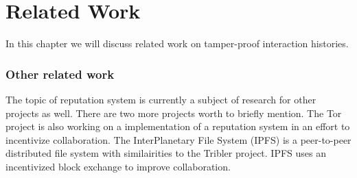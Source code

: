 \chapter{Related Work}
In this chapter we will discuss related work on tamper-proof interaction histories.





\subsection{Other related work}
The topic of reputation system is currently a subject of research for other projects as well.
There are two more projects worth to briefly mention.
The Tor project is also working on a implementation of a reputation system
in an effort to incentivize collaboration\cite{androulaki-torincentive}\cite{chen-torincentive}\cite{dingledine-torincentive}\cite{ghosh-torincentive}\cite{jansen-torincentive}.
The InterPlanetary File System (IPFS) is a peer-to-peer distributed file system with similairities to the Tribler project.
IPFS uses an incentivized block exchange to improve collaboration\cite{benet-ipfs}.